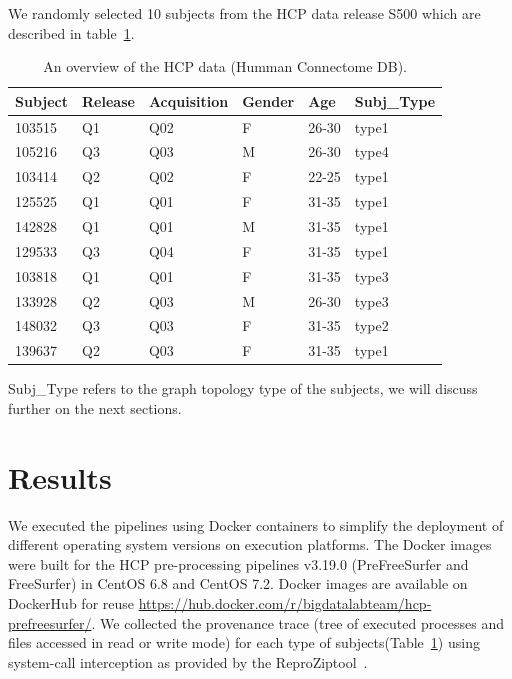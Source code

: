 \documentclass{article}
\newcommand{\reprozip}[0]{ReproZip}
\begin{document}
{We randomly selected 10 subjects from the HCP data release S500 which 
are described in table~\ref{table:data}.

\begin{table}[H]\hspace*{-1cm}
\centering
\begin{threeparttable}
\caption{An overview of the HCP data (Humman Connectome DB).}

\begin{tabular}{@{}llllll@{}}
\toprule
Subject & Release & Acquisition & Gender & Age      & Subj\_Type   \\ \midrule
103515  & Q1      & Q02         & F      & 26-30    & type1         \\
105216  & Q3      & Q03         & M      & 26-30    & type4         \\
103414  & Q2      & Q02         & F      & 22-25    & type1         \\
125525  & Q1      & Q01         & F      & 31-35    & type1         \\
142828  & Q1      & Q01         & M      & 31-35    & type1         \\
129533  & Q3      & Q04         & F      & 31-35    & type1         \\
103818  & Q1      & Q01         & F      & 31-35    & type3         \\
133928  & Q2      & Q03         & M      & 26-30    & type3         \\
148032  & Q3      & Q03         & F      & 31-35    & type2         \\
139637  & Q2      & Q03         & F      & 31-35    & type1         \\ \bottomrule
\end{tabular}
\begin{tablenotes}
      \small
      \item *Subj\_Type refers to the graph topology type of the subjects,
      we will discuss further on the next sections.
\end{tablenotes}
\end{threeparttable}
\label{table:data}
\end{table}


\section{Results}

We executed the pipelines using Docker containers to simplify the 
deployment of different operating system versions on execution 
platforms. The Docker images were built for the HCP pre-processing 
pipelines v3.19.0 (PreFreeSurfer and FreeSurfer) in 
CentOS 6.8 and CentOS 7.2. Docker images are available on DockerHub for 
reuse \url{https://hub.docker.com/r/bigdatalabteam/hcp-prefreesurfer/}. 
We collected the provenance trace (tree of executed processes and files 
accessed in read or write mode) for each type of 
subjects(Table~\ref{table:data}) using system-call interception as 
provided by the \reprozip tool~\cite{Chirigati2016}.

}
\end{document}
